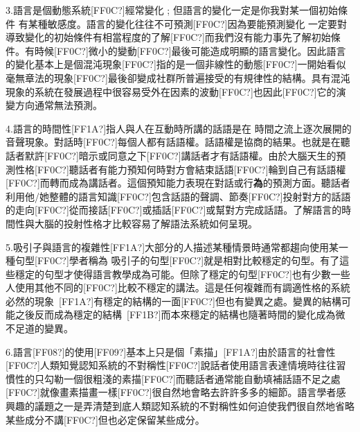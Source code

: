 3.語言是個動態系統[FF0C?]經常變化 ; 但語言的變化一定是你我對某一個初始條件 有某種敏感度。語言的變化往往不可預測[FF0C?]因為要能預測變化 一定要對導致變化的初始條件有相當程度的了解[FF0C?]而我們沒有能力事先了解初始條件。有時候[FF0C?]微小的變動[FF0C?]最後可能造成明顯的語言變化。因此語言的變化基本上是個混沌現象[FF0C?]指的是一個非線性的動態[FF0C?]一開始看似毫無章法的現象[FF0C?]最後卻變成社群所普遍接受的有規律性的結構。具有混沌現象的系統在發展過程中很容易受外在因素的波動[FF0C?]也因此[FF0C?]它的演變方向通常無法預測。

4.語言的時間性[FF1A?]指人與人在互動時所講的話語是在 時間之流上逐次展開的音聲現象。對話時[FF0C?]每個人都有話語權。話語權是協商的結果。也就是在聽話者默許[FF0C?]暗示或同意之下[FF0C?]講話者才有話語權。由於大腦天生的預測性格[FF0C?]聽話者有能力預知何時對方會結束話語[FF0C?]輪到自己有話語權[FF0C?]而轉而成為講話者。這個預知能力表現在對話或行\textbf{為}的預測方面。聽話者利用他/她整體的語言知識[FF0C?]包含話語的聲調、節奏[FF0C?]投射對方的話語的走向[FF0C?]從而接話[FF0C?]或插話[FF0C?]或幫對方完成話語。了解語言的時間性與大腦的投射性格才比較容易了解語法系統如何呈現。

5.吸引子與語言的複雜性[FF1A?]大部分的人描述某種情景時通常都趨向使用某一種句型[FF0C?]學者稱為 吸引子的句型[FF0C?]就是相對比較穩定的句型。有了這些穩定的句型才使得語言教學成為可能。但除了穩定的句型[FF0C?]也有少數一些人使用其他不同的[FF0C?]比較不穩定的講法。這是任何複雜而有調適性格的系統必然的現象~[FF1A?]有穩定的結構的一面[FF0C?]但也有變異之處。變異的結構可能之後反而成為穩定的結構~[FF1B?]而本來穩定的結構也隨著時間的變化成為微不足道的變異。

6.語言[FF08?]的使用[FF09?]基本上只是個「素描」[FF1A?]由於語言的社會性[FF0C?]人類知覺認知系統的不對稱性[FF0C?]說話者使用語言表達情境時往往習慣性的只勾勒一個很粗淺的素描[FF0C?]而聽話者通常能自動填補話語不足之處[FF0C?]就像畫素描畫一樣[FF0C?]很自然地會略去許許多多的細節。語言學者感興趣的議題之一是弄清楚到底人類認知系統的不對稱性如何迫使我們很自然地省略某些成分不講[FF0C?]但也必定保留某些成分。  



